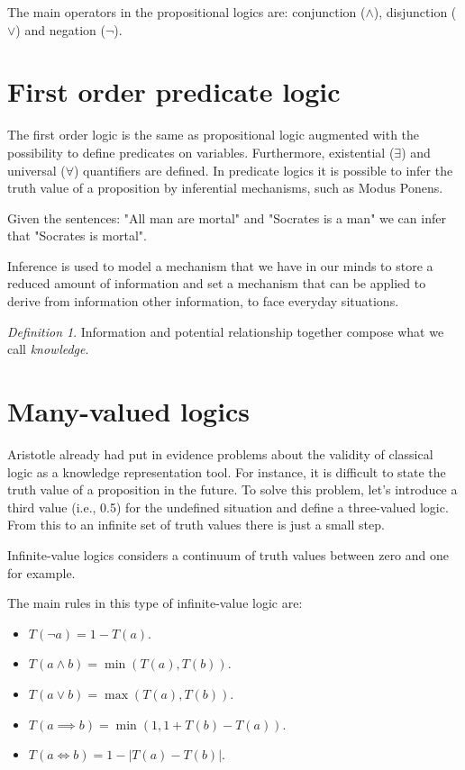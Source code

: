 \documentclass[12pt, a4paper]{report}
\theoremstyle{remark}
\newtheorem*{remark}{Definition}
\begin{document}
    The main operators in the propositional logics are: conjunction ($\land$), disjunction ($\lor$) and negation ($\lnot$).

    \section{First order predicate logic}
    The first order logic is the same as propositional logic augmented with the possibility to define predicates on variables. Furthermore, 
    existential ($\exists$) and universal ($\forall$) quantifiers are defined. 
    In predicate logics it is possible to infer the truth value of a proposition by inferential mechanisms, such as Modus Ponens. 
    \begin{example}[Inference]
        Given the sentences: "All man are mortal" and "Socrates is a man" we can infer that "Socrates is mortal".
    \end{example}
    Inference is used to model a mechanism that we have in our minds to store a reduced amount of information and set a mechanism that can be 
    applied to derive from information other information, to face everyday situations.
    \begin{remark}
        Information and potential relationship together compose what we call \emph{knowledge}.
    \end{remark}
    
    \section{Many-valued logics}
    Aristotle already had put in evidence problems about the validity of classical logic as a knowledge representation tool. For instance, it is
    difficult to state the truth value of a proposition in the future. To solve this problem, let's introduce a third value (i.e., 0.5) for the 
    undefined situation and define a three-valued logic. From this to an infinite set of truth values there is just a small step.
    
    Infinite-value logics considers a continuum of truth values between zero and one for example. 

    \begin{example}
        The main rules in this type of infinite-value logic are: 
        \begin{itemize}
            \item $T(\lnot a)=1-T(a)$.
            \item $T(a \land b)=\min (T(a),T(b))$.
            \item $T(a \lor b)=\max (T(a),T(b))$.
            \item $T(a \implies b)=\min (1, 1+T(b)-T(a))$.
            \item $T(a \Leftrightarrow b)=1-\left\lvert T(a)-T(b) \right\rvert$.
        \end{itemize}
    \end{example}
\end{document}
